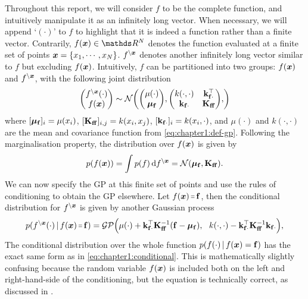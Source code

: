 Throughout this report, we will consider $f$ to be the complete function, and intuitively manipulate it as an infinitely long vector. When necessary, we will append `$(\cdot)$' to $f$ to highlight that it is indeed a function rather than a finite vector. Contrarily, $f(\vx) \in \Reals^N$ denotes the function evaluated at a finite set of points $\bm{x} = \{x_1, \cdots, x_N\}$. $f^{\setminus \bm{x}}$ denotes another infinitely long vector similar to $f$ but excluding $f(\bm{x})$. Intuitively, $f$ can be partitioned into two groups: $f(\bm{x})$ and $f^{\setminus \bm{x}}$, with the following joint distribution
\begin{equation}
  \begin{pmatrix} f^{\setminus \vx}(\cdot)\\ f(\vx) \end{pmatrix} \sim \NormDist{
    \begin{pmatrix} \mu(\cdot) \\ \vmu_{\vf} \end{pmatrix},
    \begin{pmatrix} k(\cdot, \cdot)  & \kfx\transpose \\ \kfx & \Kff \end{pmatrix},
  }
\end{equation}
where $[\boldsymbol{\mu}_{\mathbf{f}}]_{i} = \mu(x_i)$, $[\mathbf{{K}}_{\mathbf{f} \mathbf{f}}]_{i,j} = k(x_i, x_j)$, $[\mathbf{k}_{\mathbf{f} \cdot}]_i = k(x_i, \cdot)$, and $\mu(\cdot)$ and $k(\cdot, \cdot)$ are the mean and covariance function from \cref{eq:chapter1:def-gp}. Following the marginalisation property, the distribution over $f(\bm{x})$ is given by
\begin{equation}
p(f(\vx)) = \int p(f)\,\calcd{f^{\setminus \vx}} = \NormDist{\vmu_{\vf}, \Kff}.
\end{equation}
We can now specify the GP at this finite set of points and use the rules of conditioning to obtain the GP elsewhere. Let $f(\vx) \shorteq \vf$, then the conditional distribution for $f^{\setminus \bm{x}}$ is given by another Gaussian process
\begin{equation}
  \label{eq:chapter1:conditional}
  p(f^{\setminus \vx}(\cdot) \given f(\vx) \shorteq \vf) = \GP\Big(\mu(\cdot) + \kfx^\top \Kff^{-1} (\vf - \vmu_{\vf}),\ \ k(\cdot, \cdot) -  \kfx^\top \Kff^{-1} \kfx\Big),
\end{equation}
The conditional distribution over the whole function $p(f(\cdot) \,|\, f(\bm{x}) = \mathbf{f})$ has the exact same form as in \cref{eq:chapter1:conditional}. This is mathematically slightly confusing because the random variable $f(\bm{x})$ is included both on the left and right-hand-side of the conditioning, but the equation is technically correct, as discussed in \citet{matthews16,van2020framework,Leibfried2020Tutorial}.

